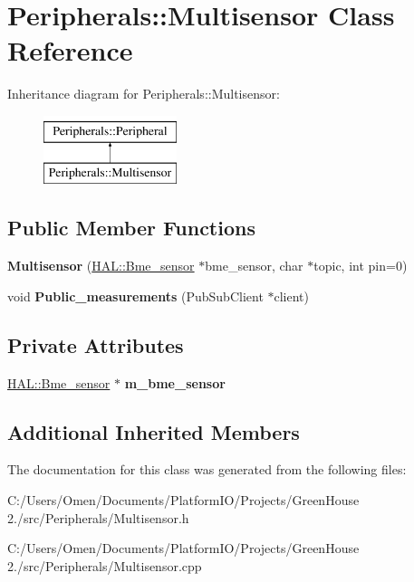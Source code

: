 \hypertarget{class_peripherals_1_1_multisensor}{}\section{Peripherals\+:\+:Multisensor Class Reference}
\label{class_peripherals_1_1_multisensor}
Inheritance diagram for Peripherals\+:\+:Multisensor\+:\begin{figure}[H]
\begin{center}
\leavevmode
\includegraphics[height=2.000000cm]{class_peripherals_1_1_multisensor}
\end{center}
\end{figure}
\subsection*{Public Member Functions}
\begin{DoxyCompactItemize}
\item 
\mbox{\label{class_peripherals_1_1_multisensor_aa5ca0e82b0530cc28db65e0d3caa7002}} 
{\bfseries Multisensor} (\hyperlink{class_h_a_l_1_1_bme__sensor}{H\+A\+L\+::\+Bme\+\_\+sensor} $\ast$bme\+\_\+sensor, char $\ast$topic, int pin=0)
\item 
\mbox{\label{class_peripherals_1_1_multisensor_a1f3f2ade91f018ca613097b94247f7ca}} 
void {\bfseries Public\+\_\+measurements} (Pub\+Sub\+Client $\ast$client)
\end{DoxyCompactItemize}
\subsection*{Private Attributes}
\begin{DoxyCompactItemize}
\item 
\mbox{\label{class_peripherals_1_1_multisensor_aa243688fa892ab7778fc8fbbc97f8cf3}} 
\hyperlink{class_h_a_l_1_1_bme__sensor}{H\+A\+L\+::\+Bme\+\_\+sensor} $\ast$ {\bfseries m\+\_\+bme\+\_\+sensor}
\end{DoxyCompactItemize}
\subsection*{Additional Inherited Members}


The documentation for this class was generated from the following files\+:\begin{DoxyCompactItemize}
\item 
C\+:/\+Users/\+Omen/\+Documents/\+Platform\+I\+O/\+Projects/\+Green\+House 2./src/\+Peripherals/Multisensor.\+h\item 
C\+:/\+Users/\+Omen/\+Documents/\+Platform\+I\+O/\+Projects/\+Green\+House 2./src/\+Peripherals/Multisensor.\+cpp\end{DoxyCompactItemize}

